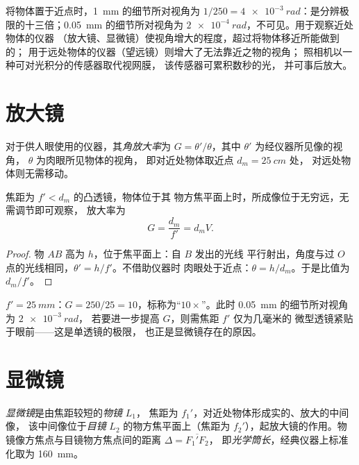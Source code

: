 \begin{remark}[仪器的用途]\label{rem:b1:optical-instruments:purpose}
将物体置于近点时，\qty{1}{mm} 的细节所对视角为 $1/250 =
\qty{4e-3}{rad}$：是分辨极限的十三倍；\qty{0.05}{mm}
的细节所对视角为 $\qty{2e-4}{rad}$，不可见。用于观察近处物体的仪器
（放大镜、显微镜）使视角增大的程度，超过将物体移近所能做到的；
用于远处物体的仪器（望远镜）则增大了无法靠近之物的视角；
照相机以一种可对光积分的传感器取代视网膜，
该传感器可累积数秒的光，
并可事后放大。
\end{remark}

\section{放大镜}

\begin{definition}[角放大率]\label{def:b1:optical-instruments:G}
对于供人眼使用的仪器，其\emph{角放大率}为
$G = \theta'/\theta$，其中 $\theta'$ 为经仪器所见像的视角，
$\theta$ 为肉眼所见物体的视角，
即对近处物体取近点 $d_m = \qty{25}{cm}$ 处，
对远处物体则无需移动。
\end{definition}

\begin{proposition}[放大镜]\label{prop:b1:optical-instruments:loupe}
焦距为 $f' < d_m$ 的凸透镜，物体位于其
物方焦平面上时，所成像位于无穷远，无需调节即可观察，
放大率为
\[
G = \frac{d_m}{f'} = d_m V .
\]
\end{proposition}

\begin{proof}
物 $AB$ 高为 $h$，位于焦平面上：自 $B$ 发出的光线
平行射出，角度与过 $O$ 点的光线相同，$\theta' = h/f'$。不借助仪器时
肉眼处于近点：$\theta = h/d_m$。于是比值为 $d_m/f'$。
\end{proof}

\begin{example}[钟表匠的放大镜]\label{ex:b1:optical-instruments:loupe}
$f' = \qty{25}{mm}$：$G = 250/25 = 10$，标称为“$10\times$”。此时
\qty{0.05}{mm} 的细节所对视角为 $\qty{2e-3}{rad}$，
若要进一步提高 $G$，则需焦距 $f'$ 仅为几毫米的
微型透镜紧贴于眼前——这是单透镜的极限，
也正是显微镜存在的原因。
\end{example}

\section{显微镜}

\begin{definition}[复式显微镜]\label{def:b1:optical-instruments:microscope}
\emph{显微镜}是由焦距较短的\emph{物镜} $L_1$，
焦距为 $f_1'$，对近处物体形成实的、放大的中间像，
该中间像位于\emph{目镜} $L_2$ 的物方焦平面上（焦距为
$f_2'$），起放大镜的作用。物镜像方焦点与目镜物方焦点间的距离 $\Delta =
\overline{F_1'F_2}$，
即\emph{光学筒长}，经典仪器上标准化取为
\qty{160}{mm}。
\end{definition}

